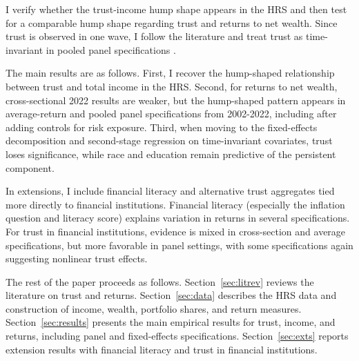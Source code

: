 \par I verify whether the trust-income hump shape appears in the HRS and then test for a comparable hump shape regarding trust and returns to net wealth. Since trust is observed in one wave, I follow the literature and treat trust as time-invariant in pooled panel specifications \cite{Lesmeister2019}.

\par The main results are as follows. First, I recover the hump-shaped relationship between trust and total income in the HRS. Second, for returns to net wealth, cross-sectional 2022 results are weaker, but the hump-shaped pattern appears in average-return and pooled panel specifications from 2002-2022, including after adding controls for risk exposure. Third, when moving to the fixed-effects decomposition and second-stage regression on time-invariant covariates, trust loses significance, while race and education remain predictive of the persistent component.

\par In extensions, I include financial literacy and alternative trust aggregates tied more directly to financial institutions. Financial literacy (especially the inflation question and literacy score) explains variation in returns in several specifications. For trust in financial institutions, evidence is mixed in cross-section and average specifications, but more favorable in panel settings, with some specifications again suggesting nonlinear trust effects.

\par The rest of the paper proceeds as follows. Section~\ref{sec:litrev} reviews the literature on trust and returns. Section~\ref{sec:data} describes the HRS data and construction of income, wealth, portfolio shares, and return measures. Section~\ref{sec:results} presents the main empirical results for trust, income, and returns, including panel and fixed-effects specifications. Section~\ref{sec:exts} reports extension results with financial literacy and trust in financial institutions.
